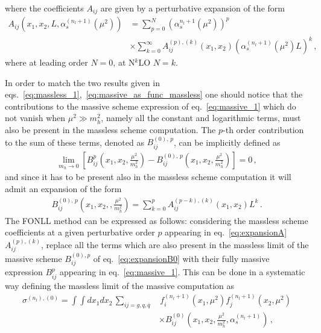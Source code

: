 where the coefficients $A_{ij}$ are given by a perturbative expansion of the form
\begin{align}
    \label{eq:expansionA}
    A_{ij}\left(x_1,x_2,L,\alpha_s^{(n_l+1)}\left(\mu^2\right)\right)&
    = \sum_{p=0}^N \left(\alpha_s^{n_l+1}\left(\mu^2\right)\right)^p \nonumber\\
    &\times\sum_{k=0}^{\infty} A_{ij}^{(p),(k)}\left(x_1,x_2\right)\left(\alpha_s^{(n_l+1)}\left(\mu^2\right)L\right)^k\,,
\end{align}
where at leading order $N=0$, at N$^k$LO $N=k$.

In order to match the two results given in eqs.~\eqref{eq:massless_1},~\eqref{eq:massive_as_func_massless} 
one should notice that the contributions to the massive scheme expression of eq.~\eqref{eq:massive_1}
which do not vanish when $\mu^2 \gg m_h^2$, namely all the constant and logarithmic terms, 
must also be present in the massless scheme computation.
The $p$-th order contribution to the sum of these terms, denoted as $B_{ij}^{(0),\,p}$, can be implicitly defined as
\begin{align}
    \lim_{m_h\rightarrow 0}\left[B_{ij}^p\left(x_1,x_2,\frac{\mu^2}{m_h^2}\right)- 
    B_{ij}^{(0),\,p}\left(x_1,x_2,\frac{\mu^2}{m_h^2}\right)\right] = 0\,,
\end{align}
and since it has to be present also in the massless scheme computation it will admit an expansion of the form
\begin{align}
    \label{eq:expansionB0}
    B_{ij}^{(0),\,p}\left(x_1,x_2,,\frac{\mu^2}{m_h^2}\right) = \sum_{k=0}^p  A_{ij}^{(p-k),(k)}\left(x_1,x_2\right)L^k\,.
\end{align}
The FONLL method can be expressed as follows: considering the massless scheme coefficients
at a given perturbative order $p$  
appearing in eq.~\eqref{eq:expansionA} $A^{(p),(k)}_{ij}$, replace all the terms which are also present in the massless limit of the massive scheme
$B^{(0),p}_{ij}$ of eq.~\eqref{eq:expansionB0} with their fully massive expression $B^{p}_{ij}$ appearing in eq.~\eqref{eq:massive_1}.
This can be done in a systematic way defining the massless limit of the massive computation as
\begin{align}
    \label{eq:massive_massless_limit}
    \sigma^{(n_l),(0)} = \int \int dx_1 dx_2\, \sum_{ij = g,q,\bar{q} }&\, 
    f_i^{(n_l+1)}\left(x_1,\mu^2\right)f_j^{(n_l+1)}\left(x_2,\mu^2\right) \nonumber \\
    &\times B^{(0)}_{ij}\left(x_1,x_2,\frac{\mu^2}{m_h^2},\alpha_s^{(n_l+1)}\right)\,,
\end{align}
